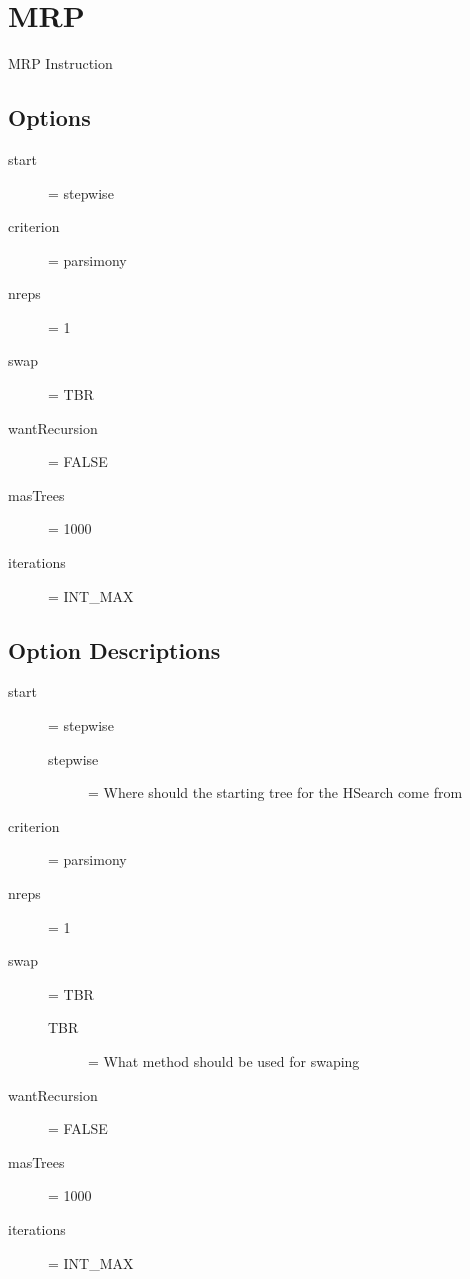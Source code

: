 \section{MRP}

MRP Instruction

\subsection{Options}
\begin{description}
\item[start] = stepwise
\item[criterion] = parsimony
\item[nreps] = 1
\item[swap] = TBR
\item[wantRecursion] = FALSE
\item[masTrees] = 1000
\item[iterations] = INT\_MAX
\end{description}

\subsection{Option Descriptions}
\begin{description}
\item[start] = stepwise
	\begin{description}
	\item[stepwise] = Where should the starting tree for the HSearch come from
	\end{description}
\item[criterion] = parsimony
\item[nreps] = 1
\item[swap] = TBR
	\begin{description}
	\item[TBR] = What method should be  used for swaping
	\end{description}
\item[wantRecursion] = FALSE
\item[masTrees] = 1000
\item[iterations] = INT\_MAX
\end{description}
